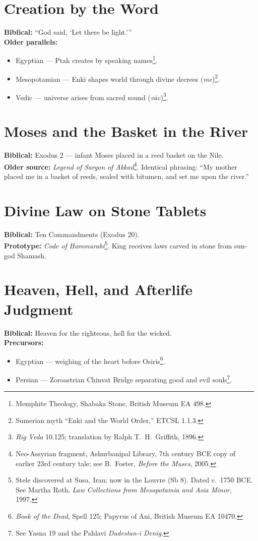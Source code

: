 \documentclass[11pt,a4paper]{article}
\begin{document}
\section{Creation by the Word}
\textbf{Biblical:} “God said, ‘Let there be light.’”\\
\textbf{Older parallels:}
\begin{itemize}
  \item Egyptian — Ptah creates by speaking names\footnote{Memphite Theology, Shabaka Stone, British Museum EA 498.}.
  \item Mesopotamian — Enki shapes world through divine decrees (\emph{me})\footnote{Sumerian myth “Enki and the World Order,” ETCSL 1.1.3.}.
  \item Vedic — universe arises from sacred sound (\emph{vāc})\footnote{\emph{Rig Veda} 10.125; translation by Ralph T.\ H.\ Griffith, 1896.}.
\end{itemize}

\section{Moses and the Basket in the River}
\textbf{Biblical:} Exodus 2 — infant Moses placed in a reed basket on the Nile.\\
\textbf{Older source:} \emph{Legend of Sargon of Akkad}\footnote{Neo-Assyrian fragment, Ashurbanipal Library, 7th century BCE copy of earlier 23rd century tale; see B.\ Foster, \emph{Before the Muses}, 2005.}.  
Identical phrasing: “My mother placed me in a basket of reeds, sealed with bitumen, and set me upon the river.”

\section{Divine Law on Stone Tablets}
\textbf{Biblical:} Ten Commandments (Exodus 20).\\
\textbf{Prototype:} \emph{Code of Hammurabi}\footnote{Stele discovered at Susa, Iran; now in the Louvre (Sb 8). Dated c.\ 1750 BCE. See Martha Roth, \emph{Law Collections from Mesopotamia and Asia Minor}, 1997.}.  
King receives laws carved in stone from sun-god Shamash.

\section{Heaven, Hell, and Afterlife Judgment}
\textbf{Biblical:} Heaven for the righteous, hell for the wicked.\\
\textbf{Precursors:}
\begin{itemize}
  \item Egyptian — weighing of the heart before Osiris\footnote{\emph{Book of the Dead}, Spell 125; Papyrus of Ani, British Museum EA 10470.}.
  \item Persian — Zoroastrian Chinvat Bridge separating good and evil souls\footnote{See Yasna 19 and the Pahlavi \emph{Dadestan-i Denig}.}.
\end{itemize}
\end{document}
